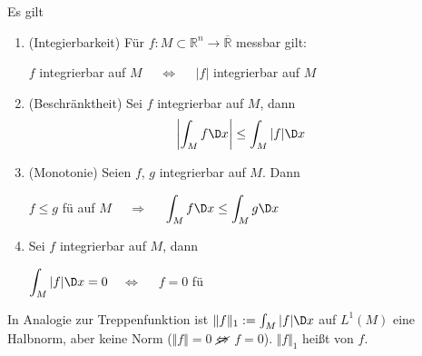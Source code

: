 \begin{proposition}[Eigenschaften]
	Es gilt \begin{enumerate}[label={\alph*)}]
		\item {}
		(Integierbarkeit) Für $f:M\subset\mathbb{R}^n\to\overline{\mathbb{R}}$ messbar gilt:\begin{center}
				$f$ integrierbar auf $M$ \ \ $\Leftrightarrow$ \ \  $\vert f \vert$ integrierbar auf $M$
		\end{center}
		\item{}
		(Beschränktheit)
		Sei $f$ integrierbar auf $M$, dann \begin{align*}
			\left\vert \int_M f \D x \right\vert &\le \int_M \vert f \vert \D x
		\end{align*}
		\item{}
		(Monotonie)
		Seien $f$, $g$ integrierbar auf $M$. Dann \begin{center}
			$f\le g$ \gls{fü} auf $M$ \ \ $\Rightarrow$ \ \ $\displaystyle\int_M f\D x \le \int_M g \D x$
		\end{center}
		\item{}
		 Sei $f$ integrierbar auf $M$, dann \begin{center}
				$\displaystyle \int_M \vert f \vert \D x = 0$\ \ $\Leftrightarrow$ \ \ $f = 0$ \gls{fü}
		\end{center}
	\end{enumerate}
	In Analogie zur Treppenfunktion ist $\Vert f\Vert _1 := \int_M \vert f \vert \D x$ auf $L^1(M)$ eine Halbnorm, aber keine Norm ($\Vert f \Vert = 0$ $\cancel{\Leftrightarrow}$ $f = 0$). $\Vert f\Vert_1$ heißt  von $f$.
\end{proposition}

